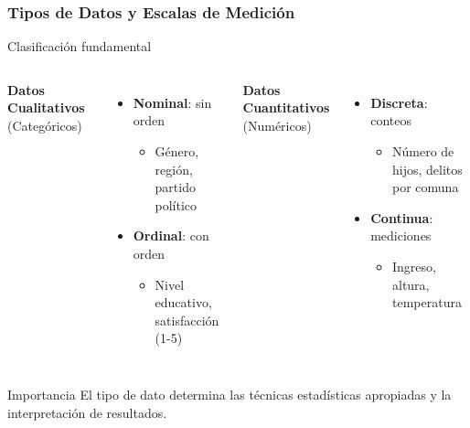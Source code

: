 \documentclass[aspectratio=169,11pt]{beamer}
\begin{document}
\begin{frame}[fragile]
\frametitle{Tipos de Datos y Escalas de Medición}

\begin{exampleblock}{Clasificación fundamental}
  \begin{columns}[T]
    \textbf{Datos Cualitativos} (Categóricos)
    \begin{itemize}
      \item \textbf{Nominal}: sin orden
        \begin{itemize}
          \scriptsize
          \item Género, región, partido político
        \end{itemize}
      \item \textbf{Ordinal}: con orden
        \begin{itemize}
          \scriptsize
          \item Nivel educativo, satisfacción (1-5)
        \end{itemize}
    \end{itemize}

    \textbf{Datos Cuantitativos} (Numéricos)
    \begin{itemize}
      \item \textbf{Discreta}: conteos
        \begin{itemize}
          \scriptsize
          \item Número de hijos, delitos por comuna
        \end{itemize}
      \item \textbf{Continua}: mediciones
        \begin{itemize}
          \scriptsize
          \item Ingreso, altura, temperatura
        \end{itemize}
    \end{itemize}
  \end{columns}
\end{exampleblock}

\pause
\vspace{0.3cm}

\begin{alertblock}{Importancia}
  El tipo de dato determina las técnicas estadísticas apropiadas y la interpretación de resultados.
\end{alertblock}
\end{frame}
\end{document}
